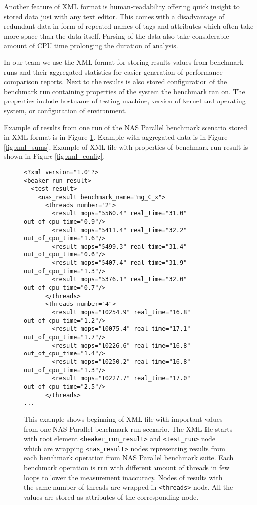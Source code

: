Another feature of XML format is human-readability offering quick insight to stored
data just with any text editor.
This comes with a disadvantage of redundant data in form of repeated names of
tags and attributes which often take more space than the data itself. Parsing of
the data also take considerable amount of CPU time prolonging the duration of
analysis.

In our team we use the XML format for storing results values from benchmark runs
and their aggregated statistics for easier generation of performance comparison
reports. Next to the results is also stored configuration of the benchmark run
containing properties of the system the benchmark ran on. The properties include
hostname of testing machine, version of kernel and operating system, or
configuration of environment.

Example of results from one run of the NAS Parallel benchmark scenario stored in
XML format is in Figure \ref{fig:xml_result}. Example with aggregated
data is in Figure \ref{fig:xml_sums}. Example of XML file with properties
of benchmark run result is shown in Figure \ref{fig:xml_config}.

\begin{figure}
  \small
  \begin{verbatim}
<?xml version="1.0"?>
<beaker_run_result>
  <test_result>
    <nas_result benchmark_name="mg_C_x">
      <threads number="2">
        <result mops="5560.4" real_time="31.0" out_of_cpu_time="0.9"/>
        <result mops="5411.4" real_time="32.2" out_of_cpu_time="1.6"/>
        <result mops="5499.3" real_time="31.4" out_of_cpu_time="0.6"/>
        <result mops="5407.4" real_time="31.9" out_of_cpu_time="1.3"/>
        <result mops="5376.1" real_time="32.0" out_of_cpu_time="0.7"/>
      </threads>
      <threads number="4">
        <result mops="10254.9" real_time="16.8" out_of_cpu_time="1.2"/>
        <result mops="10075.4" real_time="17.1" out_of_cpu_time="1.7"/>
        <result mops="10226.6" real_time="16.8" out_of_cpu_time="1.4"/>
        <result mops="10250.2" real_time="16.8" out_of_cpu_time="1.3"/>
        <result mops="10227.7" real_time="17.0" out_of_cpu_time="2.5"/>
      </threads>
...
\end{verbatim}
  \normalsize
  \caption{This example shows beginning of XML file with important values from one NAS
    Parallel benchmark run scenario. The XML file starts with root element
    \texttt{<beaker\_run\_result>} and \texttt{<test\_run>} node which are wrapping
    \texttt{<nas\_result>} nodes representing results from each benchmark operation
    from NAS Parallel benchmark suite. Each benchmark operation is run with
    different amount of threads in few loops to lower the measurement inaccuracy.
    Nodes of results with the same number of threads are wrapped in
    \texttt{<threads>} node. All the values are stored as attributes of the
    corresponding node.}
  \label{fig:xml_result}
\end{figure}

